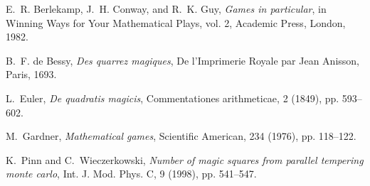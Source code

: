 \documentclass[a4paper,12pt]{article}
\begin{document}

 


\begin{thebibliography}{99}

    E.~R. Berlekamp, J.~H. Conway, and R.~K. Guy, \emph{Games in particular}, in Winning Ways for Your Mathematical Plays, vol. 2, Academic Press, London, 1982.

    B.~F. de Bessy, \emph{Des quarrez magiques}, De l’Imprimerie Royale par Jean Anisson, Paris, 1693.

    L.~Euler, \emph{De quadratis magicis}, Commentationes arithmeticae, 2 (1849), pp. 593–602.

    M.~Gardner, \emph{Mathematical games}, Scientific American, 234 (1976), pp. 118–122.

    K.~Pinn and C.~Wieczerkowski, \emph{Number of magic squares from parallel tempering monte carlo}, Int. J. Mod. Phys. C, 9 (1998), pp. 541–547.
\end{thebibliography}

\end{document}
